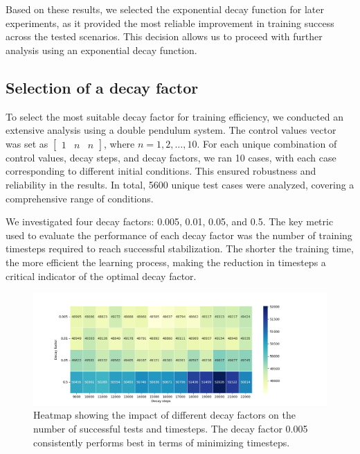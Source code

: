 Based on these results, we selected the exponential decay function for later experiments, as it provided the most reliable improvement in training success across the tested scenarios. This decision allows us to proceed with further analysis using an exponential decay function.

\subsection{Selection of a decay factor}

To select the most suitable decay factor for training efficiency, we conducted an extensive analysis using a double pendulum system. The control values vector was set as \(\begin{bmatrix} 1 & n & n \end{bmatrix}\), where \(n = 1, 2, \ldots, 10\). For each unique combination of control values, decay steps, and decay factors, we ran 10 cases, with each case corresponding to different initial conditions. This ensured robustness and reliability in the results. In total, 5600 unique test cases were analyzed, covering a comprehensive range of conditions.

We investigated four decay factors: 0.005, 0.01, 0.05, and 0.5. The key metric used to evaluate the performance of each decay factor was the number of training timesteps required to reach successful stabilization. The shorter the training time, the more efficient the learning process, making the reduction in timesteps a critical indicator of the optimal decay factor.

\begin{figure}[h] 
	\centering 
	\includegraphics[width=15cm]{Figures/MaxSuccessfulTestsTimesteps_heatmap.png} 
	\caption{Heatmap showing the impact of different decay factors on the number of successful tests and timesteps. The decay factor 0.005 consistently performs best in terms of minimizing timesteps.} 
	\label{fig: decay factors comparison}
\end{figure}

